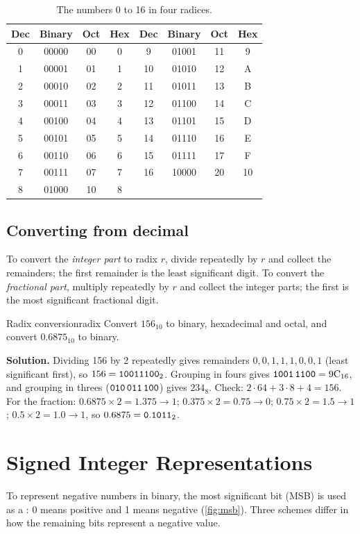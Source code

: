 \begin{table}[htbp]
\centering
\small
\caption{The numbers 0 to 16 in four radices.}
\label{tab:radix}
\begin{tabular}{@{}cccc@{\hspace{2.5em}}cccc@{}}
\toprule
Dec & Binary & Oct & Hex & Dec & Binary & Oct & Hex\\
\midrule
0&00000&00&0 & 9 &01001&11&9\\
1&00001&01&1 & 10&01010&12&A\\
2&00010&02&2 & 11&01011&13&B\\
3&00011&03&3 & 12&01100&14&C\\
4&00100&04&4 & 13&01101&15&D\\
5&00101&05&5 & 14&01110&16&E\\
6&00110&06&6 & 15&01111&17&F\\
7&00111&07&7 & 16&10000&20&10\\
8&01000&10&8 & &&&\\
\bottomrule
\end{tabular}
\end{table}

\subsection{Converting from decimal}
To convert the \emph{integer part} to radix $r$, divide repeatedly by $r$ and collect the remainders; the first remainder is the least significant digit. To convert the \emph{fractional part}, multiply repeatedly by $r$ and collect the integer parts; the first is the most significant fractional digit.

\begin{example}{Radix conversion}{radix}
Convert $156_{10}$ to binary, hexadecimal and octal, and convert $0.6875_{10}$ to binary.

\textbf{Solution.} Dividing 156 by 2 repeatedly gives remainders $0,0,1,1,1,0,0,1$ (least significant first), so $156 = \mathtt{10011100}_2$. Grouping in fours gives $\mathtt{1001}\,\mathtt{1100}=9\mathrm{C}_{16}$, and grouping in threes ($\mathtt{010}\,\mathtt{011}\,\mathtt{100}$) gives $234_8$. Check: $2\cdot64+3\cdot8+4=156$.
For the fraction: $0.6875\times2=1.375\to1$; $0.375\times2=0.75\to0$; $0.75\times2=1.5\to1$; $0.5\times2=1.0\to1$, so $0.6875=\mathtt{0.1011}_2$.
\end{example}

\section{Signed Integer Representations}\label{sec:signed}
To represent negative numbers in binary, the most significant bit (MSB) is used as a : 0 means positive and 1 means negative (\cref{fig:msb}). Three schemes differ in how the remaining bits represent a negative value.

